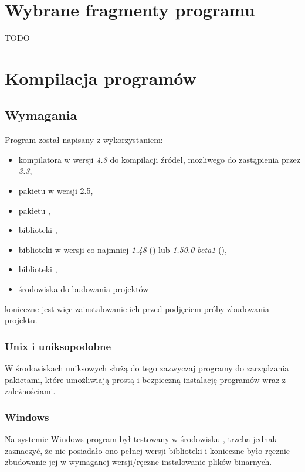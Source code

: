 \documentclass{standalone}
\begin{document}
\appendix

\chapter{Wybrane fragmenty programu}

TODO

\chapter{Kompilacja programów}

\section{Wymagania}

Program został napisany z wykorzystaniem:
\begin{itemize}
\item kompilatora  w wersji \textit{4.8} do kompilacji źródeł, możliwego do zastąpienia przez
 \textit{3.3},
\item pakietu  w wersji 2.5,
\item pakietu ,
\item biblioteki ,
\item biblioteki  w wersji co najmniej \textit{1.48} () lub \textit{1.50.0-beta1}
(),
\item biblioteki ,
\item środowiska do budowania projektów 
\end{itemize}
konieczne jest więc zainstalowanie ich przed podjęciem próby zbudowania projektu.

\subsection{Unix i uniksopodobne}

W środowiskach uniksowych służą do tego zazwyczaj programy do zarządzania pakietami, które umożliwiają prostą
i bezpieczną instalację programów wraz z zależnościami.

\subsection{Windows}

Na systemie Windows program był testowany w środowisku , trzeba jednak zaznaczyć, że nie posiadało
ono pełnej wersji biblioteki  i konieczne było ręcznie zbudowanie jej w wymaganej wersji/ręczne
instalowanie plików binarnych.
\end{document}
